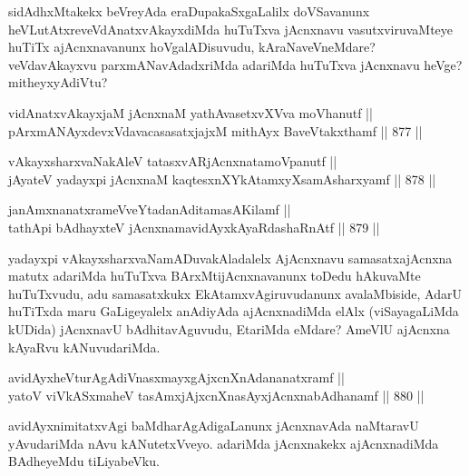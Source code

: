 \begin{artha}
sidAdhxMtakekx beVreyAda eraDupakaSxgaLalilx doVSavanunx heVLutAtxre\ndash  veVdAnatxvAkayxdiMda huTuTxva jAcnxnavu vasutxviruvaMteye huTiTx ajAcnxnavanunx hoVgalADisuvudu, kAraNaveVneMdare? veVdavAkayxvu parxmANavAdadxriMda adariMda huTuTxva jAcnxnavu heVge? mitheyxyAdiVtu?
\end{artha}

\begin{shl}
vidAnatxvAkayxjaM jAcnxnaM yathAvasetxvXVva moVhanutf || \\
pArxmANAyxdevxVdavacasasatxjajxM mithAyx BaveVtakxthamf \hfill || 877 ||  
\end{shl}

\vskip 2cm


\begin{shl}
vAkayxsharxvaNakAleV tatasxvARjAcnxnatamoVpanutf || \\
jAyateV yadayxpi jAcnxnaM kaqtesxnXYkAtamxyXsamAsharxyamf \hfill || 878 ||  
\end{shl}
				
\begin{shl}
janAmxnanatxrameVveYtadanAditamasA\s Kilamf || \\
tathA\s pi bAdhayxteV jAcnxnamavidAyxkAyaRdashaRnAtf \hfill || 879 ||  
\end{shl}

\begin{artha}
yadayxpi vAkayxsharxvaNamADuvakAladalelx AjAcnxnavu samasatxajAcnxna matutx adariMda huTuTxva BArxMtijAcnxnavanunx toDedu hAkuvaMte huTuTxvudu, adu samasatxkukx EkAtamxvAgiruvudanunx avalaMbiside, AdarU huTiTxda maru GaLigeyalelx anAdiyAda ajAcnxnadiMda elAlx (viSayagaLiMda kUDida) jAcnxnavU bAdhitavAguvudu, EtariMda eMdare? AmeVlU ajAcnxna kAyaRvu kANuvudariMda.
\end{artha}

\begin{shl}
avidAyxheVturAgAdiVnasxmayxgAjxcnXnAdananatxramf || \\
yatoV viVkASxmaheV tasAmxjAjxcnXnasAyxjAcnxnabAdhanamf \hfill || 880 ||  
\end{shl}

\begin{artha}
avidAyxnimitatxvAgi baMdharAgAdigaLanunx jAcnxnavAda naMtaravU yAvudariMda nAvu kANutetxVveyo. adariMda jAcnxnakekx ajAcnxnadiMda BAdheyeMdu tiLiyabeVku.
\end{artha}

